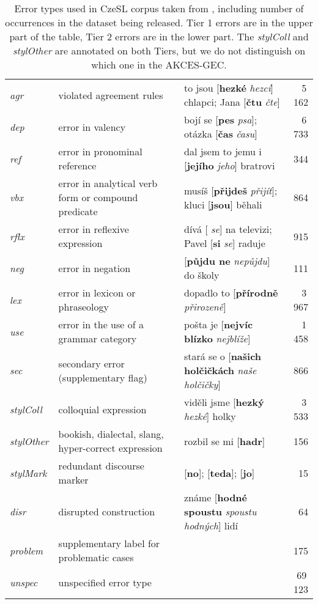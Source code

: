 \documentclass[11pt,a4paper]{article}
\begin{document}
\begin{table*}[ht!]
\begin{tabular}{l|l|l|r}
\emph{agr} & violated agreement rules & to jsou [\textbf{hezké}  \emph{hezcí}] chlapci; Jana [\textbf{čtu}  \emph{čte}] & 5\,162 \\
\emph{dep} & error in valency & bojí se [\textbf{pes}  \emph{psa}]; otázka [\textbf{čas}  \emph{času}] & 6\,733 \\ \emph{ref} & error in pronominal reference  & dal jsem to jemu i [\textbf{jejího}  \emph{jeho}] bratrovi & 344 \\
\emph{vbx} & error in analytical verb form or compound predicate & musíš [\textbf{přijdeš}  \emph{přijít}]; kluci [\textbf{jsou}] běhali & 864 \\ \emph{rflx} & error in reflexive expression & dívá [ \emph{se}] na televizi; Pavel [\textbf{si}  \emph{se}] raduje & 915 \\
\emph{neg} & error in negation & [\textbf{půjdu ne}  \emph{nepůjdu}] do školy & 111\\
\emph{lex} & error in lexicon or phraseology & dopadlo to [\textbf{přírodně}  \emph{přirozeně}] & 3\,967 \\
\emph{use} & error in the use of a grammar category & pošta je [\textbf{nejvíc blízko}  \emph{nejblíže}]  & 1\,458 \\ \emph{sec} & secondary error (supplementary flag) & stará se o [\textbf{našich holčičkách}  \emph{naše holčičky}] & 866 \\
\emph{stylColl} & colloquial expression & viděli jsme [\textbf{hezký}  \emph{hezké}] holky & 3\,533 \\
\emph{stylOther} & bookish, dialectal, slang, hyper-correct expression & rozbil se mi [\textbf{hadr}] & 156 \\
\emph{stylMark} & redundant discourse marker & [\textbf{no}]; [\textbf{teda}]; [\textbf{jo}] & 15 \\
\emph{disr} & disrupted construction & známe [\textbf{hodné spoustu}  \emph{spoustu hodných}] lidí & 64 \\
\hline
\emph{problem} & supplementary label for problematic cases &  & 175 \\
\hline
\emph{unspec} & unspecified error type &  & 69\,123 \\
    \end{tabular}
    \caption{Error types used in CzeSL corpus taken from \cite{CzeSL:TSD2012}, including number of occurrences in the dataset being released. Tier 1 errors are in the upper part of the table, Tier 2 errors are in the lower part.
    The \textit{stylColl} and \textit{stylOther} are annotated on both Tiers, but we do not distinguish on which one
    in the AKCES-GEC.}
    \label{tab:czesl_errors}
\end{table*}
\end{document}
